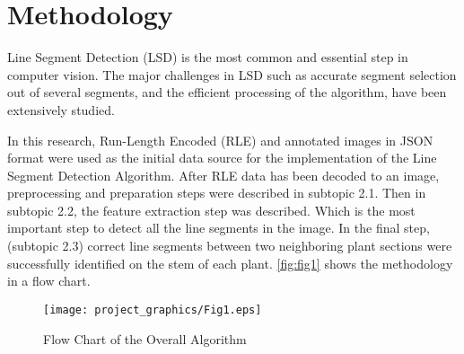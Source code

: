\documentclass[]{iat}
\begin{document}
\chapter{Methodology}
Line Segment Detection (LSD) is the most common and essential step in computer vision. The major challenges in LSD such as accurate segment selection out of several segments, and the efficient processing of the algorithm, have been extensively studied.
\par
In this research, Run-Length Encoded (RLE) and annotated images in JSON format were used as the initial data source for the implementation of the Line Segment Detection Algorithm. After RLE data has been decoded to an image, preprocessing and preparation steps were described in subtopic 2.1. Then in subtopic 2.2, the feature extraction step was described. Which is the most important step to detect all the line segments in the image. In the final step, (subtopic 2.3) correct line segments between two neighboring plant sections were successfully identified on the stem of each plant. \autoref{fig:fig1} shows the methodology in a flow chart.

\FloatBarrier
\begin{figure}[h]
    
	\texttt{[image: project\_graphics/Fig1.eps]}
	\caption{Flow Chart of the Overall Algorithm }
	\label{fig:fig1}
\end{figure}
\end{document}
